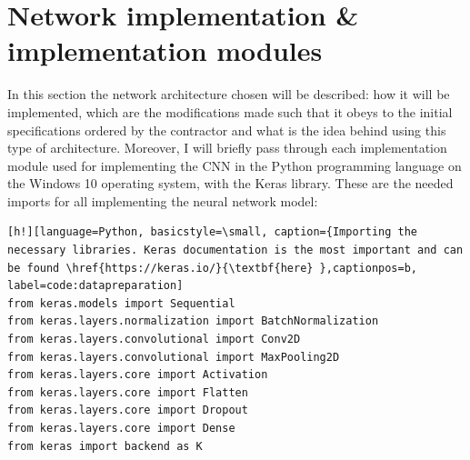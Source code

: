 \documentclass[12pt,a4paper,twoside]{report}
\begin{document}
\section{Network implementation \& implementation modules}
In this section the network architecture chosen will be described: how it will be implemented, which are the modifications made such that it obeys to the initial specifications ordered by the contractor and what is the idea behind using this type of architecture. Moreover, I will briefly pass through each implementation module used for implementing the CNN in the Python programming language on the Windows 10 operating system, with the Keras library. These are the needed imports for all implementing the neural network model:

\begin{lstlisting}[h!][language=Python, basicstyle=\small, caption={Importing the necessary libraries. Keras documentation is the most important and can be found \href{https://keras.io/}{\textbf{here} },captionpos=b, label=code:datapreparation]
from keras.models import Sequential
from keras.layers.normalization import BatchNormalization
from keras.layers.convolutional import Conv2D
from keras.layers.convolutional import MaxPooling2D
from keras.layers.core import Activation
from keras.layers.core import Flatten
from keras.layers.core import Dropout
from keras.layers.core import Dense
from keras import backend as K
 
\end{lstlisting}
\end{document}
